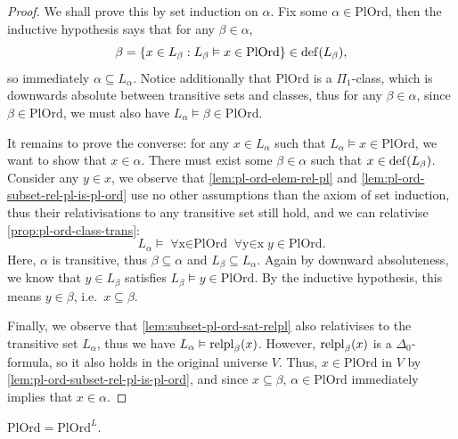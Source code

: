 \documentclass[12pt,openany]{book}
\theoremstyle{plain}
\theoremstyle{definition}
\newcommand\opA[1]{\mathop{\forall #1}}
\DeclareMathOperator\dd{def}
\DeclareMathOperator\relpl{relpl}
\newcommand\IKP{\mathrm{IKP}}
\newcommand\PlOrd{\mathrm{PlOrd}}
\begin{document}
\begin{proof}
  We shall prove this by set induction on $\alpha$. Fix some $\alpha \in \PlOrd$, then the inductive hypothesis says that for any $\beta \in \alpha$,
  \[\beta = \left\{x \in L_\beta : L_\beta \vDash x \in \PlOrd\right\} \in \dd\mleft(L_\beta\mright),\]
  so immediately $\alpha \subseteq L_\alpha$. Notice additionally that $\PlOrd$ is a $\Pi_1$-class, which is downwards absolute between transitive sets and classes, thus for any $\beta \in \alpha$, since $\beta \in \PlOrd$, we must also have $L_\alpha \vDash \beta \in \PlOrd$.

  It remains to prove the converse: for any $x \in L_\alpha$ such that $L_\alpha \vDash x \in \PlOrd$, we want to show that $x \in \alpha$. There must exist some $\beta \in \alpha$ such that $x \in \dd\mleft(L_\beta\mright)$. Consider any $y \in x$, we observe that \autoref{lem:pl-ord-elem-rel-pl} and \autoref{lem:pl-ord-subset-rel-pl-is-pl-ord} use no other assumptions than the axiom of set induction, thus their relativisations to any transitive set still hold, and we can relativise \autoref{prop:pl-ord-class-trans}:
  \[L_\alpha \vDash \opA{x \in \PlOrd} \opA{y \in x} y \in \PlOrd.\]
  Here, $\alpha$ is transitive, thus $\beta \subseteq \alpha$ and $L_\beta \subseteq L_\alpha$. Again by downward absoluteness, we know that $y \in L_\beta$ satisfies $L_\beta \vDash y \in \PlOrd$. By the inductive hypothesis, this means $y \in \beta$, i.e.\ $x \subseteq \beta$.

  Finally, we observe that \autoref{lem:subset-pl-ord-sat-relpl} also relativises to the transitive set $L_\alpha$, thus we have $L_\alpha \vDash \relpl_\beta\mleft(x\mright)$. However, $\relpl_\beta\mleft(x\mright)$ is a $\Delta_0$-formula, so it also holds in the original universe $V$. Thus, $x \in \PlOrd$ in $V$ by \autoref{lem:pl-ord-subset-rel-pl-is-pl-ord}, and since $x \subseteq \beta$, $\alpha \in \PlOrd$ immediately implies that $x \in \alpha$.
\end{proof}

\begin{corollary}[$\IKP$]
  \label{cor:l-preserve-pl-ord}
  $\PlOrd = \PlOrd^L$.
\end{corollary}
\end{document}
